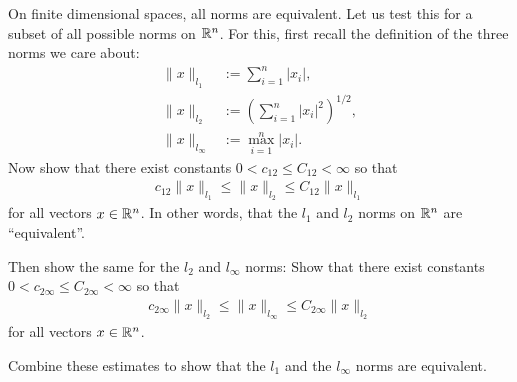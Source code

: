 \documentclass[12pt]{memoir}
\begin{document}
\begin{Ej}
    On finite dimensional spaces, all norms are equivalent. Let us test
    this for a subset of all possible norms on $\mathbb{R}^n$. For this, first
    recall the definition of the three norms we care about:
    \begin{align*}
      \| x \|_{l_1} &:= \sum_{i=1}^n |x_i|, \\
      \| x \|_{l_2} &:= \left(\sum_{i=1}^n |x_i|^2 \right)^{1/2}, \\
      \| x \|_{l_\infty} &:= \max_{i=1}^n |x_i|.
    \end{align*}
    Now show that there
    exist constants $0<c_{12}\le C_{12} <\infty$ so that
    \begin{align*}
      c_{12} \| x \|_{l_1} \le \| x \|_{l_2} \le C_{12} \| x \|_{l_1}
    \end{align*}
    for all vectors $x\in \mathbb{R}^n$. In other words, that the $l_1$ and $l_2$
    norms on $\mathbb{R}^n$ are ``equivalent''.
    
    Then show the same for the $l_2$ and $l_\infty$ norms: Show that there
    exist constants $0<c_{2\infty}\le C_{2\infty} <\infty$ so that
    \begin{align*}
      c_{2\infty} \| x \|_{l_2} \le \| x \|_{l_\infty} \le C_{2\infty} \| x \|_{l_2}
    \end{align*}
    for all vectors $x\in \mathbb{R}^n$.
    
    Combine these estimates to show that the $l_1$ and the $l_\infty$
    norms are equivalent.
\end{Ej}

\begin{ptcbr}
\end{ptcbr}
\end{document}
